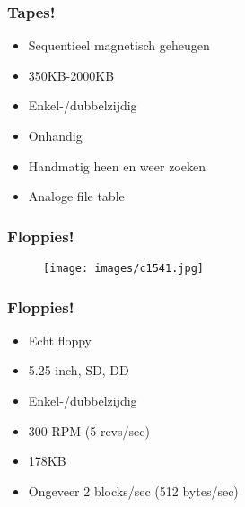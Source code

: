 \documentclass[aspectratio=43]{uva-inf-presentation}
\begin{document}

\begin{frame}
\frametitle{Tapes!}

\begin{itemize}
\item Sequentieel magnetisch geheugen
\item 350KB-2000KB
\item Enkel-/dubbelzijdig
\item Onhandig
\item Handmatig heen en weer zoeken
\item Analoge file table
\end{itemize}

\end{frame}


\begin{frame}
\frametitle{Floppies!}

\begin{figure}
\texttt{[image: images/c1541.jpg]}
\end{figure}

\end{frame}


\begin{frame}
\frametitle{Floppies!}

\begin{itemize}
\item Echt floppy
\item 5.25 inch, SD, DD
\item Enkel-/dubbelzijdig
\item 300 RPM (5 revs/sec)
\item 178KB
\item Ongeveer 2 blocks/sec (512 bytes/sec)
\end{itemize}

\end{frame}

\end{document}
